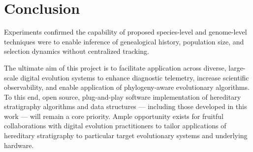 \section{Conclusion} \label{sec:conclusion}

Experiments confirmed the capability of proposed species-level and genome-level techniques were to enable inference of genealogical history, population size, and selection dynamics without centralized tracking.

The ultimate aim of this project is to facilitate application across diverse, large-scale digital evolution systems to enhance diagnostic telemetry, increase scientific observability, and enable application of phylogeny-aware evolutionary algorithms.
To this end, open source, plug-and-play software implementation of hereditary stratigraphy algorithms and data structures --- including those developed in this work --- will remain a core priority.
Ample opportunity exists for fruitful collaborations with digital evolution practitioners to tailor applications of hereditary stratigraphy to particular target evolutionary systems and underlying hardware.
